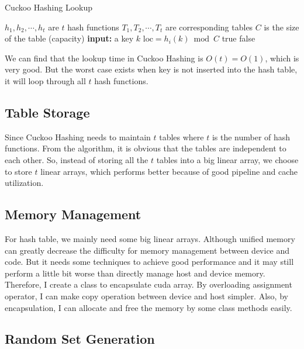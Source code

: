 \documentclass[10pt,twocolumn,letterpaper]{article}
\begin{document}
\begin{algorithm}
    \caption{Cuckoo Hashing Lookup}
    \label{basic_lookup}
    \begin{algorithmic}
        \STATE $h_1, h_2, \cdots, h_t$ are $t$ hash functions
	    \STATE $T_1, T_2, \cdots, T_t$ are corresponding tables
	    \STATE $C$ is the size of the table (capacity)
	    \STATE \textbf{input:} a key $k$
	        \STATE $\text{loc} = h_i(k) \bmod C$
	            \RETURN true
	        \ENDIF
	    \ENDFOR
	    \RETURN false
    \end{algorithmic}
\end{algorithm}

We can find that the lookup time in Cuckoo Hashing is $O(t) = O(1)$, which is very good. But the worst case exists when key is not inserted into the hash table, it will loop through all $t$ hash functions.

\subsection{Table Storage}

Since Cuckoo Hashing needs to maintain $t$ tables where $t$ is the number of hash functions. From the algorithm, it is obvious that the tables are independent to each other. So, instead of storing all the $t$ tables into a big linear array, we choose to store $t$ linear arrays, which performs better because of good pipeline and cache utilization.

\subsection{Memory Management}

For hash table, we mainly need some big linear arrays. Although unified memory can greatly decrease the difficulty for memory management between device and code. But it needs some techniques to achieve good performance and it may still perform a little bit worse than directly manage host and device memory. Therefore, I create a class to encapsulate cuda array. By overloading assignment operator, I can make copy operation between device and host simpler. Also, by encapsulation, I can allocate and free the memory by some class methods easily. 

\subsection{Random Set Generation}
\end{document}
